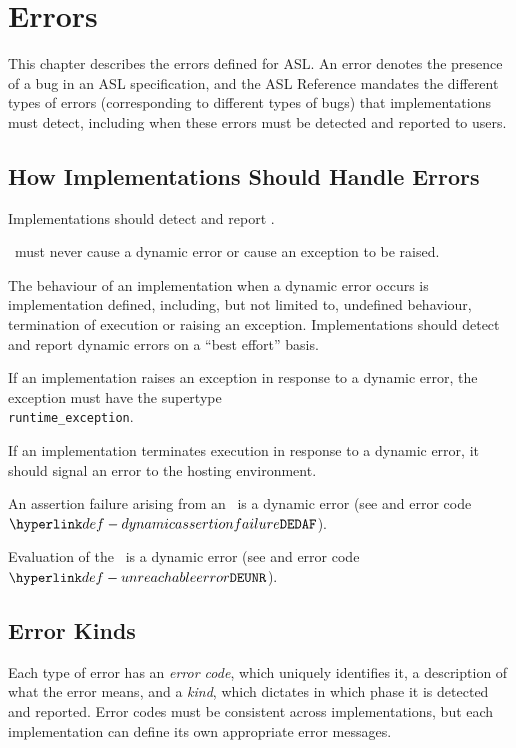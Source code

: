 \chapter{Errors\label{chap:Errors}}

This chapter describes the errors defined for ASL.
%
An error denotes the presence of a bug in an ASL specification,
and the ASL Reference mandates the different types of errors
(corresponding to different types of bugs) that implementations must detect,
including when these errors must be detected and reported to users.

\section{How Implementations Should Handle Errors}

 Implementations should detect and report \staticerrorsterm.

 \Staticerrorsterm\ must never cause a dynamic error or
cause an exception to be raised.

 The behaviour of an implementation when a dynamic error
occurs is implementation defined, including, but
not limited to, undefined behaviour, termination of execution or raising an exception.
%
Implementations should detect and report dynamic errors on a ``best effort'' basis.

If an implementation raises an exception in response to a dynamic error,
the exception must have the supertype \\
\verb|runtime_exception|.

If an implementation terminates execution in response to a dynamic error,
it should signal an error to the hosting environment.

An assertion failure arising from an \assertionstatementterm\ is a dynamic error
(see  and error code $\DynamicAssertionFailure$).

Evaluation of the \unreachablestatementterm\ is a dynamic error
(see  and error code $\UnreachableError$).

\section{Error Kinds}
Each type of error has an \emph{error code}, which uniquely identifies it,
a description of what the error means,
and a \emph{kind}, which dictates in which phase it is detected and reported.
Error codes must be consistent across implementations, but each implementation
can define its own appropriate error messages.

